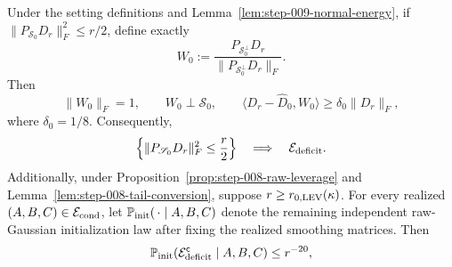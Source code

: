 \begin{proposition}
\label{prop:step-009-raw-witness}
Under the setting definitions and
Lemma~\ref{lem:step-009-normal-energy}, if
\(\|P_{\mathscr S_0}D_r\|_F^2\le r/2\), define exactly
\begin{equation}
  W_0:=\frac{P_{\mathscr S_0^\perp}D_r}
  {\|P_{\mathscr S_0^\perp}D_r\|_F}.
  \label{eq:step-009-5}
\end{equation}
Then
\begin{equation}
  \|W_0\|_F=1,
  \qquad
  W_0\perp\mathscr S_0,
  \qquad
  \langle D_r-\widehat D_0,W_0\rangle
  \ge\delta_0\|D_r\|_F,
  \label{eq:step-009-6}
\end{equation}
where \(\delta_0=1/8\). Consequently,
\begin{equation}
  \left\{\|P_{\mathscr S_0}D_r\|_F^2\le\frac r2\right\}
  \quad\Longrightarrow\quad
  \mathcal E_{\rm deficit}.
  \label{eq:step-009-7}
\end{equation}
Additionally, under Proposition~\ref{prop:step-008-raw-leverage} and
Lemma~\ref{lem:step-008-tail-conversion}, suppose
\(r\ge r_{0,\rm LEV}(\kappa)\). For every realized
\((A,B,C)\in\mathcal E_{\rm cond}\), let
\(\mathbb P_{\rm init}(\,\cdot\mid A,B,C)\) denote the remaining independent
raw-Gaussian initialization law after fixing the realized smoothing matrices.
Then
\begin{equation}
  \mathbb P_{\rm init}(\mathcal E_{\rm deficit}^{\mathsf c}\mid A,B,C)
  \le r^{-20},
  \label{eq:step-009-conditional-deficit}
\end{equation}

\end{proposition}

